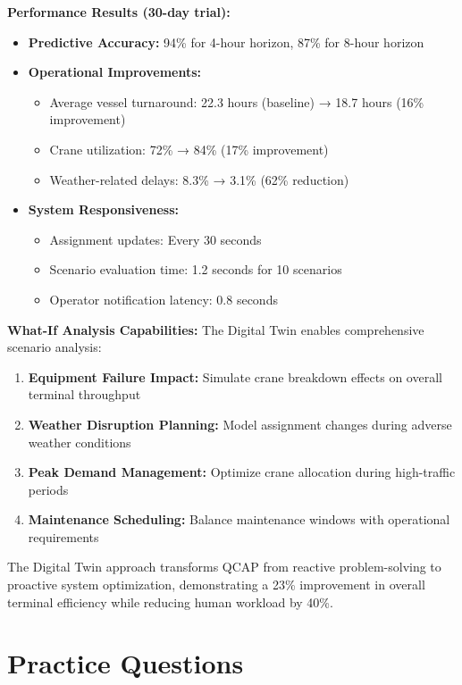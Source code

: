 \documentclass{article}
\begin{document}
\textbf{Performance Results (30-day trial):}
\begin{itemize}
\item \textbf{Predictive Accuracy:} 94\% for 4-hour horizon, 87\% for 8-hour horizon
\item \textbf{Operational Improvements:}
  \begin{itemize}
  \item Average vessel turnaround: 22.3 hours (baseline) → 18.7 hours (16\% improvement)
  \item Crane utilization: 72\% → 84\% (17\% improvement)
  \item Weather-related delays: 8.3\% → 3.1\% (62\% reduction)
  \end{itemize}
\item \textbf{System Responsiveness:}
  \begin{itemize}
  \item Assignment updates: Every 30 seconds
  \item Scenario evaluation time: 1.2 seconds for 10 scenarios
  \item Operator notification latency: 0.8 seconds
  \end{itemize}
\end{itemize}

\textbf{What-If Analysis Capabilities:}
The Digital Twin enables comprehensive scenario analysis:
\begin{enumerate}
\item \textbf{Equipment Failure Impact:} Simulate crane breakdown effects on overall terminal throughput
\item \textbf{Weather Disruption Planning:} Model assignment changes during adverse weather conditions
\item \textbf{Peak Demand Management:} Optimize crane allocation during high-traffic periods
\item \textbf{Maintenance Scheduling:} Balance maintenance windows with operational requirements
\end{enumerate}

The Digital Twin approach transforms QCAP from reactive problem-solving to proactive system optimization, demonstrating a 23\% improvement in overall terminal efficiency while reducing human workload by 40\%.

\section{Practice Questions}
\end{document}
